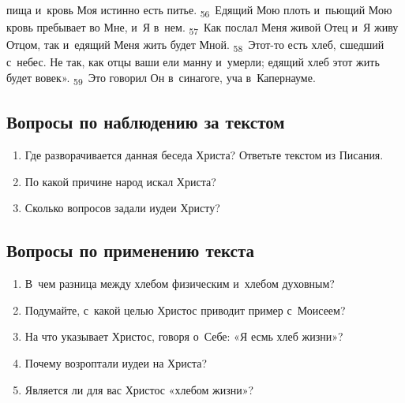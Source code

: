 \documentclass[a4paper,12pt]{article}
\begin{document}
пища и~кровь Моя истинно есть питье. \textsubscript{56}~Едящий Мою плоть и~пьющий Мою кровь пребывает во Мне, и~Я в~нем. \textsubscript{57}~Как послал Меня живой Отец и~Я живу Отцом, так и~едящий Меня жить будет Мной. \textsubscript{58}~Этот-то есть хлеб, сшедший с~небес. Не так, как отцы ваши ели манну и~умерли; едящий хлеб этот жить будет вовек». \textsubscript{59}~Это говорил Он в~синагоге, уча в~Капернауме. 

\subsection*{Вопросы по наблюдению за текстом}
\begin{enumerate}
    \item Где разворачивается данная беседа Христа? Ответьте текстом из Писания. 
    
    \myline
    
    \myline
    \item По какой причине народ искал Христа? 
    
    \myline
    
    \myline
    \item Сколько вопросов задали иудеи Христу? 
    
    \myline
    
    \myline
\end{enumerate}

\subsection*{Вопросы по применению текста} 
\begin{enumerate}
    \item В~чем разница между хлебом физическим и~хлебом духовным? 
    
    \myline
    
    \myline
    \item Подумайте, с~какой целью Христос приводит пример с~Моисеем? 
    
    \myline
    
    \myline
    \item На что указывает Христос, говоря о~Себе: «Я есмь хлеб жизни»? 
    
    \myline
    
    \myline
    \item Почему возроптали иудеи на Христа? 
    
    \myline
    
    \myline
    \item Является ли для вас Христос «хлебом жизни»?
    
    \myline
    
    \myline
\end{enumerate}
\end{document}

